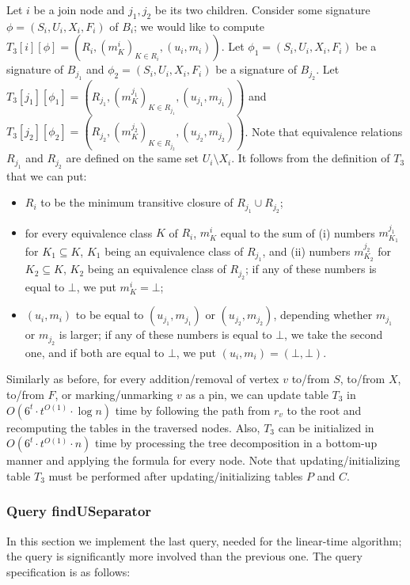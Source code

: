 \documentclass[a4paper,11pt]{article}
\theoremstyle{definition}
\theoremstyle{remark}
\newcommand{\qUsep}{\textnormal{findUSeparator}}
\begin{document}
 Let $i$ be a join node and
$j_1,j_2$ be its two children.  Consider some signature
$\phi=(S_i,U_i,X_i,F_i)$ of $B_i$; we would like to compute
$T_3[i][\phi]=(R_i,(m^i_K)_{K\in R_i},(u_i,m_i))$.  Let
$\phi_1=(S_i,U_i,X_i,F_i)$ be a signature of $B_{j_1}$ and
$\phi_2=(S_i,U_i,X_i,F_i)$ be a signature of $B_{j_2}$.  Let
$T_3[j_1][\phi_1]=(R_{j_1},(m^{j_1}_K)_{K\in
  R_{j_1}},(u_{j_1},m_{j_1}))$ and
$T_3[j_2][\phi_2]=(R_{j_2},(m^{j_2}_K)_{K\in
  R_{j_2}},(u_{j_2},m_{j_2}))$.  Note that equivalence relations
$R_{j_1}$ and $R_{j_2}$ are defined on the same set $U_i\setminus X_i$.  It
follows from the definition of $T_3$ that we can put:
\begin{itemize}
\item $R_i$ to be the minimum transitive closure of $R_{j_1}\cup
  R_{j_2}$;
\item for every equivalence class $K$ of $R_i$, $m^i_K$ equal to the
  sum of (i) numbers $m^{j_1}_{K_1}$ for $K_1\subseteq K$, $K_1$ being
  an equivalence class of $R_{j_1}$, and (ii) numbers $m^{j_2}_{K_2}$
  for $K_2\subseteq K$, $K_2$ being an equivalence class of $R_{j_2}$;
  if any of these numbers is equal to $\bot$, we put $m^i_K=\bot$;
\item $(u_i,m_i)$ to be equal to $(u_{j_1},m_{j_1})$ or
  $(u_{j_2},m_{j_2})$, depending whether $m_{j_1}$ or $m_{j_2}$ is
  larger; if any of these numbers is equal to $\bot$, we take the
  second one, and if both are equal to $\bot$, we put $(u_i,m_i)=(\bot,\bot)$.
\end{itemize}

\vskip 0.3cm

Similarly as before, for every addition/removal of vertex $v$ to/from
$S$, to/from $X$, to/from $F$, or marking/unmarking $v$ as a pin, we
can update table $T_3$ in $O(6^t\cdot t^{O(1)}\cdot \log n)$ time by
following the path from $r_v$ to the root and recomputing the tables
in the traversed nodes.  Also, $T_3$ can be initialized in $O(6^t\cdot
t^{O(1)}\cdot n)$ time by processing the tree decomposition in a
bottom-up manner and applying the formula for every node.  Note that
updating/initializing table $T_3$ must be performed after
updating/initializing tables $P$ and $C$.

\subsubsection{Query \qUsep}\label{sec:queries}

In this section we implement the last query, needed for the
linear-time algorithm; the query is significantly more involved than
the previous one.  The query specification is as follows:
\end{document}
